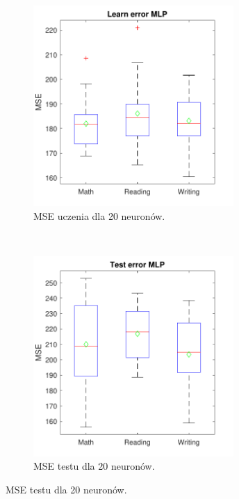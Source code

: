 \documentclass[12pt]{article}
\begin{document}
\begin{figure}[H]
\centering
\begin{subfigure}[t]{0.48\textwidth} 
\centering
\includegraphics[height=3in]{tansig_purelin_20_learnBoxplot.pdf}
\caption{MSE uczenia dla 20 neuronów.}
\end{subfigure}
~~
\begin{subfigure}[t]{0.48\textwidth} 
\centering
\includegraphics[height=3in]{tansig_purelin_20_testBoxplot.pdf}
\caption{MSE testu dla 20 neuronów.}
\end{subfigure}


\end{figure}
\end{document}
